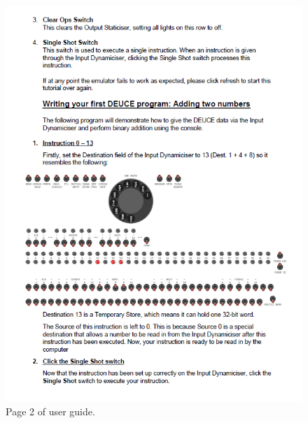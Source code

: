 \documentclass{l4proj}
\begin{document}
\begin{appendices}
\begin{figure}
	\centering
	\includegraphics{images/ug-2}
	\caption{Page 2 of user guide.}
	\label{fig:pg-2}
\end{figure}


\end{appendices}
\end{document}
